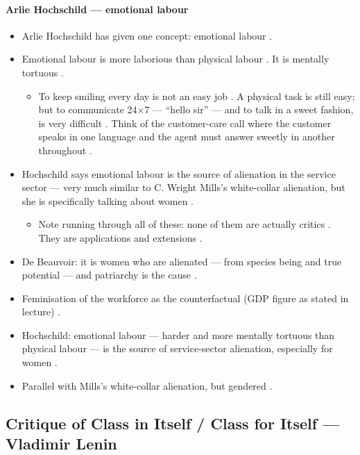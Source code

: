 \paragraph{Arlie Hochschild --- emotional labour}
\begin{itemize}
    \item Arlie Hochschild has given one concept: emotional labour .
    \item Emotional labour is more laborious than physical labour . It is mentally tortuous .
    \begin{itemize}
        \item To keep smiling every day is not an easy job . A physical task is still easy; but to communicate 24$\times$7 --- ``hello sir'' --- and to talk in a sweet fashion, is very difficult . Think of the customer-care call where the customer speaks in one language and the agent must answer sweetly in another throughout .
    \end{itemize}
    \item Hochschild says emotional labour is the source of alienation in the service sector --- very much similar to C. Wright Mills's white-collar alienation, but she is specifically talking about women .
    \begin{itemize}
        \item Note running through all of these: none of them are actually critics . They are applications and extensions .
    \end{itemize}
\end{itemize}

\begin{QuickRevision}
\begin{itemize}
    \item De Beauvoir: it is women who are alienated --- from species being and true potential --- and patriarchy is the cause .
    \item Feminisation of the workforce as the counterfactual (GDP figure as stated in lecture) .
    \item Hochschild: emotional labour --- harder and more mentally tortuous than physical labour --- is the source of service-sector alienation, especially for women .
    \item Parallel with Mills's white-collar alienation, but gendered .
\end{itemize}
\end{QuickRevision}

\subsection{Critique of Class in Itself / Class for Itself --- Vladimir Lenin}

